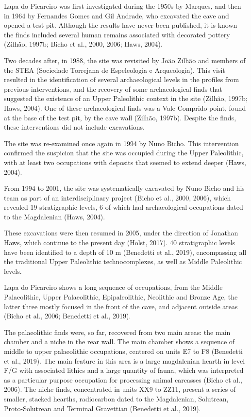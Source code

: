 \documentclass[12pt,twoside]{reedthesis}
\begin{document}
Lapa do Picareiro was first investigated during the 1950s by Marques, and then in 1964 by Fernandes Gomes and Gil Andrade, who excavated the cave and opened a test pit. Although the results have never been published, it is known the finds included several human remains associated with decorated pottery (Zilhão, 1997b; Bicho et al., 2000, 2006; Haws, 2004).

Two decades after, in 1988, the site was revisited by João Zilhão and members of the STEA (Sociedade Torrejana de Espeleologia e Arqueologia). This visit resulted in the identification of several archaeological levels in the profiles from previous interventions, and the recovery of some archaeological finds that suggested the existence of an Upper Paleolithic context in the site (Zilhão, 1997b; Haws, 2004). One of these archaeological finds was a Vale Comprido point, found at the base of the test pit, by the cave wall (Zilhão, 1997b). Despite the finds, these interventions did not include excavations.

The site was re-examined once again in 1994 by Nuno Bicho. This intervention confirmed the suspicion that the site was occupied during the Upper Paleolithic, with at least two occupations with deposits that seemed to extend deeper (Haws, 2004).

From 1994 to 2001, the site was systematically excavated by Nuno Bicho and his team as part of an interdisciplinary project (Bicho et al., 2000, 2006), which revealed 19 stratigraphic levels, 6 of which had archaeological occupations dated to the Magdalenian (Haws, 2004).

These excavations were then resumed in 2005, under the direction of Jonathan Haws, which continue to the present day (Holst, 2017). 40 stratigraphic levels have been identified to a depth of 10 m (Benedetti et al., 2019), encompassing all the traditional Upper Paleolithic technocomplexes, as well as Middle Paleolithic levels.

Lapa do Picareiro shows a long sequence of occupations, from the Middle Palaeolithic, Upper Palaeolithic, Epipaleolithic, Neolithic and Bronze Age, the latter three mostly focused in the front of the cave, and adjacent outside areas (Bicho et al., 2006; Benedetti et al., 2019).

The palaeolithic finds were, so far, recovered from two main areas: the main chamber and a niche in the rear wall. The main chamber shows a sequence of middle to upper palaeolithic occupations, centered on units E7 to F8 (Benedetti et al., 2019). The main feature in this area is a large magdalenian hearth in level F/G with associated lithics and a large quantity of fauna, which was interpreted as a particular purpose occupation for processing animal carcasses (Bicho et al., 2006). The niche finds, concentrated in units XX9 to ZZ11, present a series of smaller, stacked hearths, radiocarbon dated to the Magdalenian, Solutrean, Proto-Solutrean and Terminal Gravettian (Benedetti et al., 2019).
\end{document}
